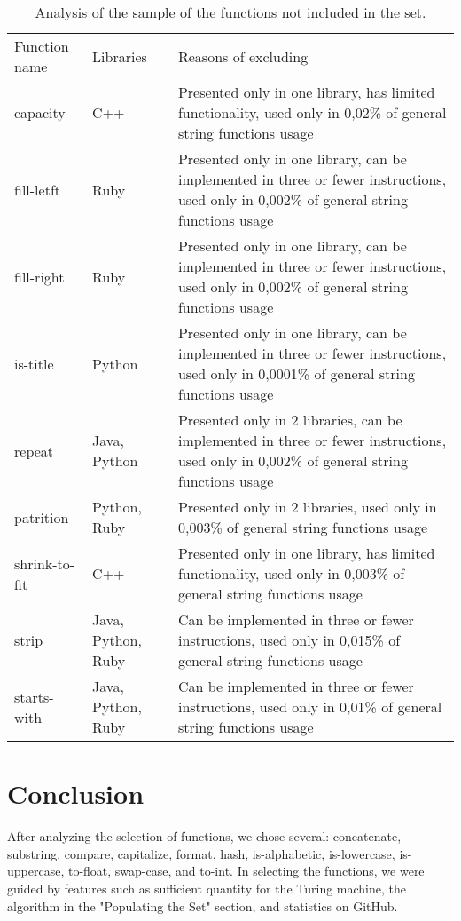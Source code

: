 \documentclass[11pt,nonacm,natbib=false]{acmart}
\begin{document}
\begin{table}
\begin{tabular}{l | l | p{265pt}}
Function name & Libraries          & Reasons of excluding                                                                                                                      \\
capacity      & C++                & Presented only in one library, has limited functionality, used only in 0,02\% of general string functions usage                           \\
fill-letft    & Ruby               & Presented only in one library, can be implemented in three or fewer instructions, used only in 0,002\% of general string functions usage  \\
fill-right    & Ruby               & Presented only in one library, can be implemented in three or fewer instructions, used only in 0,002\% of general string functions usage  \\
is-title      & Python             & Presented only in one library, can be implemented in three or fewer instructions, used only in 0,0001\% of general string functions usage \\
repeat        & Java, Python       & Presented only in 2 libraries, can be implemented in three or fewer instructions, used only in 0,002\% of general string functions usage  \\
patrition     & Python, Ruby       & Presented only in 2 libraries, used only in 0,003\% of general string functions usage                                                     \\
shrink-to-fit & C++                & Presented only in one library, has limited functionality, used only in 0,003\% of general string functions usage                          \\
strip         & Java, Python, Ruby & Can be implemented in three or fewer instructions, used only in 0,015\% of general string functions usage                                 \\
starts-with   & Java, Python, Ruby & Can be implemented in three or fewer instructions, used only in 0,01\% of general string functions usage                                 
\end{tabular}
\caption{\label{tab:excluded_functions}Analysis of the sample of the functions not included in the set.}
\end{table}

\section{Conclusion}
After analyzing the selection of functions, we chose several: concatenate, substring, compare, capitalize, format, hash, is-alphabetic, is-lowercase, is-uppercase, to-float, swap-case, and to-int. In selecting the functions, we were guided by features such as sufficient quantity for the Turing machine, the algorithm in the "Populating the Set" section, and statistics on GitHub. 
\end{document}
